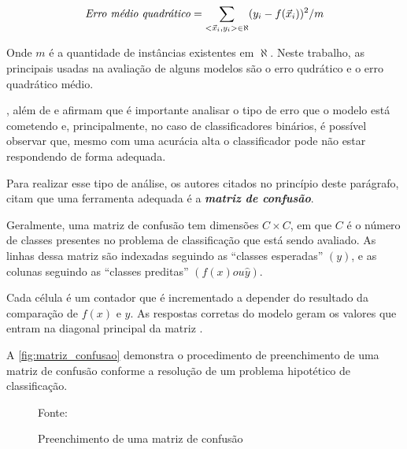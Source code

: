 \begin{equation}\label{erro_quadratico_medio}
\textrm{\textit{Erro médio quadrático}}=\sum_{<\vec{x}_i, y_i> \in \aleph} (y_i - f(\vec{x}_i))^2/m
\end{equation}

Onde $m$ é a quantidade de instâncias existentes em $\aleph$. Neste trabalho, as principais usadas na avaliação de alguns modelos são o erro qudrático e o erro quadrático médio.

,  além de  e  afirmam que é importante analisar o tipo de erro que o modelo está cometendo e, principalmente, no caso de classificadores binários, é possível observar que, mesmo com uma acurácia alta o classificador pode não estar respondendo de forma adequada. 

Para realizar esse tipo de análise, os autores citados no princípio deste parágrafo, citam que uma ferramenta adequada é a \textit{\textbf{matriz de confusão}}. 

Geralmente, uma matriz de confusão tem dimensões $C \times C$, em que $C$ é o número de classes presentes no problema de classificação que está sendo avaliado. As linhas dessa matriz são indexadas seguindo as ``classes esperadas'' $(y)$, e as colunas seguindo as ``classes preditas'' $(f(x) ou \hat{y})$. 

Cada célula é um contador que é incrementado a depender do resultado da comparação de $f(x)$ e $y$. As respostas corretas do modelo geram os valores que entram na diagonal principal da matriz \cite[p. 130]{Boscarioli2017}.

A \autoref{fig:matriz_confusao} demonstra o procedimento de preenchimento de uma matriz de confusão conforme a resolução de um problema hipotético de classificação.

\begin{figure}[h!]
	\centering
	\caption{Preenchimento de uma matriz de confusão}
	
	{\scriptsize Fonte: }
	\label{fig:matriz_confusao}
\end{figure}

